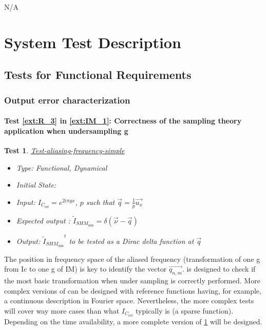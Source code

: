 \documentclass[12pt, titlepage]{article}
\newtheorem{Test}{Test}
\begin{document}
N/A
\section{System Test Description}
	
\subsection{Tests for Functional Requirements}
\renewcommand{\labelitemi}{$\star$}

\subsubsection{Output error characterization}
	
\paragraph{Test \cref{ext:R_3} in \cref{ext:IM_1}: Correctness of the sampling theory application when undersampling g}

\begin{Test}\normalfont\underline{Test-aliasing-frequency-simple}
\label{aliasing-frequency-simple}
\begin{itemize}
\item Type: Functional, Dynamical
\item Initial State: 
\item Input: $I_{C_{\text{ref}}}=e^{2i\pi gx}$, $p$ such that $\overrightarrow{q}=\frac{1}{p}\vec{u_x}$
\item Expected output : $\widetilde{I}_{\mathit{SHM}_{\text{sim}}}=\delta(\vec{\nu}-\vec{q})$
\item Output: ${\widetilde{I}_{\mathit{SHM}_{\text{sim}}}}^{t}$ to be tested as a Dirac delta function at $\overrightarrow{q}$
\end{itemize}
\end{Test}
		
The position in frequency space of the aliased frequency (transformation of one g from Ic to one g of IM) is key to identify the vector $\overrightarrow{q_{n,m}}$.  is designed to check if the most basic transformation when under sampling is correctly performed. More complex versions of  can be designed with reference functions having, for example, a continuous description in Fourier space. Nevertheless, the more complex tests will cover way more cases than what $I_{C_{\text{ref}}}$ typically is (a sparse function). Depending on the time availability, a more complete version of \cref{aliasing-frequency-simple} will be designed.
		
\end{document}

